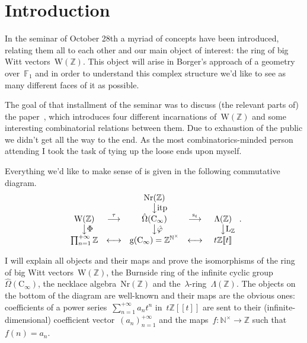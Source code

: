 \section*{Introduction}
In the seminar of October 28th a myriad of concepts have been introduced, relating them all to each other and our main object of interest: the ring of big Witt vectors~$\mathrm{W}(\mathbb{Z})$. This object will arise in Borger's approach of a geometry over~$\mathbb{F}_1$ and in order to understand this complex structure we'd like to see as many different faces of it as possible.

The goal of that installment of the seminar was to discuss (the relevant parts of) the paper~\cite{the-burnside-ring}, which introduces four different incarnations of~$\mathrm{W}(\mathbb{Z})$ and some interesting combinatorial relations between them. Due to exhaustion of the public we didn't get all the way to the end. As the most combinatorics-minded person attending I took the task of tying up the loose ends upon myself.

Everything we'd like to make sense of is given in the following commutative diagram.
\begin{equation}
  \label{equation:commutative-diagram}
  \begin{array}{ccccc}
    & & \mathrm{Nr}(\mathbb{Z}) & & \\
    & & \phantom{\textrm{itp}}\big\downarrow\textrm{itp} & & \\
    \mathrm{W}(\mathbb{Z}) & \overset{\tau}{\longrightarrow} & \hat{\Omega}(\mathrm{C}_\infty) & \overset{\mathrm{s}_t}{\longrightarrow} & \Lambda(\mathbb{Z}) \\
    \phantom{\Phi}\big\downarrow\Phi & & \phantom{\hat{\varphi}}\big\downarrow\hat{\varphi} & & \phantom{\mathrm{L}_{\mathbb{Z}}}\big\downarrow\mathrm{L}_{\mathbb{Z}} \\
    \prod_{n=1}^{+\infty}\mathbb{Z} & \longleftrightarrow & \mathrm{g}(\mathrm{C}_\infty)=\mathbb{Z}^{\mathbb{N}^\times} & \longleftrightarrow & t\mathbb{Z}[\![t]\!]
  \end{array}.
\end{equation}

I will explain all objects and their maps and prove the isomorphisms of the ring of big Witt vectors~$\mathrm{W}(\mathbb{Z})$, the Burnside ring of the infinite cyclic group~$\hat{\Omega}(\mathrm{C}_\infty)$, the necklace algebra~$\mathrm{Nr}(\mathbb{Z})$ and the~$\lambda$\nobreakdash-ring~$\Lambda(\mathbb{Z})$. The objects on the bottom of the diagram are well-known and their maps are the obvious ones: coefficients of a power series~$\sum_{n=1}^{+\infty}a_nt^n$ in~$t\mathbb{Z}[\![t]\!]$ are sent to their (infinite-dimensional) coefficient vector~$(a_n)_{n=1}^{+\infty}$ and the maps~$f\colon\mathbb{N}^\times\to\mathbb{Z}$ such that~$f(n)=a_{n}$.

